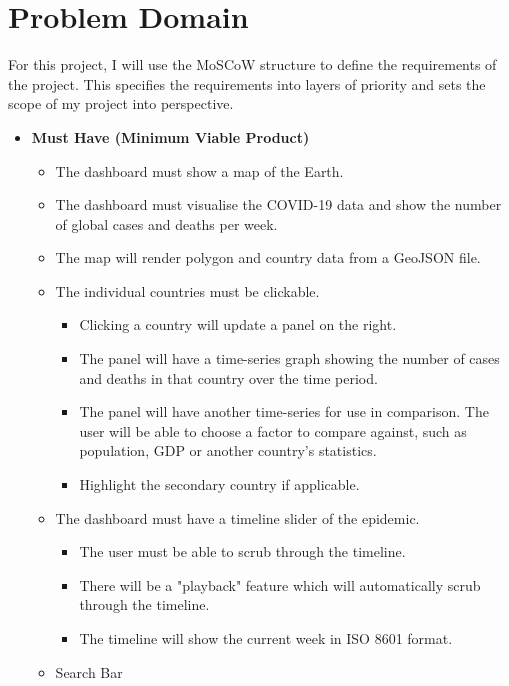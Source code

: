 \documentclass{report}
\begin{document}
\chapter{Problem Domain}
For this project, I will use the MoSCoW structure to define the requirements of the project. This specifies the requirements into layers of priority and sets the scope of my project into perspective.\\
\begin{itemize}
    \item \textbf{\Large{Must Have (Minimum Viable Product)}}
    \begin{itemize}
        \item The dashboard must show a map of the Earth.
        \item The dashboard must visualise the COVID-19 data and show the number of global cases and deaths per week.
        \item The map will render polygon and country data from a GeoJSON file.
        \item The individual countries must be clickable.
        \begin{itemize}
            \item Clicking a country will update a panel on the right.
            \item The panel will have a time-series graph showing the number of cases and deaths in that country over the time period.
            \item The panel will have another time-series for use in comparison. The user will be able to choose a factor to compare against, such as population, GDP or another country's statistics.
            \item Highlight the secondary country if applicable.
        \end{itemize}
        \item The dashboard must have a timeline slider of the epidemic.
        \begin{itemize}
            \item The user must be able to scrub through the timeline.
            \item There will be a "playback" feature which will automatically scrub through the timeline.
            \item The timeline will show the current week in ISO 8601 format.
        \end{itemize}
        \item Search Bar
        \begin{itemize}

\end{itemize}
\end{itemize}
\end{itemize}
\end{document}

